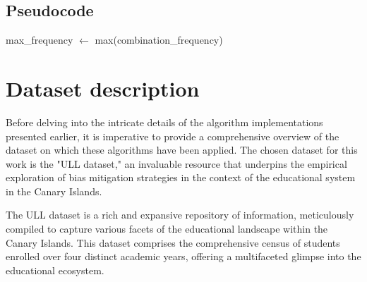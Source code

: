 \documentclass[12pt,a4paper,openright,twoside]{book}
\begin{document}
\subsection{Pseudocode}
\begin{algorithm}[H]


    max\_frequency $\gets$ max(combination\_frequency)\;
\end{algorithm}
\newpage
\section{Dataset description}
Before delving into the intricate details of the algorithm implementations presented earlier, it is imperative to provide a comprehensive overview of the dataset on which these algorithms have been applied. The chosen dataset for this work is the "ULL dataset," an invaluable resource that underpins the empirical exploration of bias mitigation strategies in the context of the educational system in the Canary Islands. 

The ULL dataset is a rich and expansive repository of information, meticulously compiled to capture various facets of the educational landscape within the Canary Islands. This dataset comprises the comprehensive census of students enrolled over four distinct academic years, offering a multifaceted glimpse into the educational ecosystem. 
\end{document}
